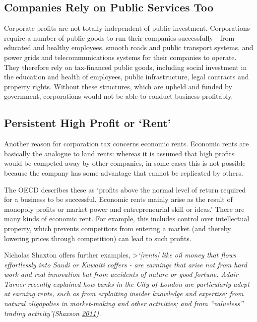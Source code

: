 \documentclass[]{tufte-handout}
\begin{document}
\hypertarget{companies-rely-on-public-services-too}{%
\subsection{Companies Rely on Public Services
Too}\label{companies-rely-on-public-services-too}}

Corporate profits are not totally independent of public investment.
Corporations require a number of public goods to run their companies
successfully - from educated and healthy employees, smooth roads and
public transport systems, and power grids and telecommunications systems
for their companies to operate. They therefore rely on tax-financed
public goods, including social investment in the education and health of
employees, public infrastructure, legal contracts and property rights.
Without these structures, which are upheld and funded by government,
corporations would not be able to conduct business profitably.

\hypertarget{persistent-high-profit-or-rent}{%
\subsection{Persistent High Profit or
`Rent'}\label{persistent-high-profit-or-rent}}

Another reason for corporation tax concerns economic rents. Economic
rents are basically the analogue to land rents: whereas it is assumed
that high profits would be competed away by other companies, in some
cases this is not possible because the company has some advantage that
cannot be replicated by others.

The OECD describes these as `profits above the normal level of return
required for a business to be successful. Economic rents mainly arise as
the result of monopoly profits or market power and entrepreneurial skill
or ideas.' There are many kinds of economic rent. For example, this
includes control over intellectual property, which prevents competitors
from entering a market (and thereby lowering prices through competition)
can lead to such profits.

Nicholas Shaxton offers further examples,
\textgreater{}\emph{`{[}rents{]} like oil money that flows effortlessly
into Saudi or Kuwaiti coffers - are earnings that arise not from hard
work and real innovation but from accidents of nature or good fortune.
Adair Turner recently explained how banks in the City of London are
particularly adept at earning rents, such as from exploiting insider
knowledge and expertise; from natural oligopolies in market-making and
other activities; and from ``valueless'' trading activity'(Shaxson
\protect\hyperlink{ref-Shaxson2011}{2011}).}
\end{document}
